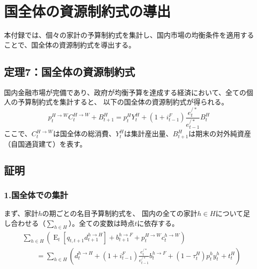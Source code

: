 
\chapter{国全体の資源制約式の導出}
\label{chap:appendix_resource_constraint}

本付録では、個々の家計の予算制約式を集計し、国内市場の均衡条件を適用することで、国全体の資源制約式を導出する。

\section*{定理7：国全体の資源制約式}
\label{sec:appendix_resource_constraint_theorem7}

国内金融市場が完備であり、政府が均衡予算を達成する経済において、全ての個人の予算制約式を集計すると、
以下の国全体の資源制約式が得られる。
\begin{equation}
\label{form:appendix_resource_constraint_theorem7_main}
p_t^{H\to W}C_t^{H\to W}+B_{t+1}^H=p_t^HY_t^H+(1+i_{t-1}^F)\frac{e_t^{/*}}{e_{t-1}^{/*}}B_t^H
\end{equation}
ここで、\(C_t^{H\to W}\)は国全体の総消費、\(Y_t^H\)は集計産出量、\(B_{t+1}^H\)は期末の対外純資産（自国通貨建て）を表す。

\section*{証明}
\label{sec:appendix_resource_constraint_proof}

\subsection*{1.国全体での集計}
\label{sec:appendix_resource_constraint_sub1}
まず、家計\(h\)の期ごとの名目予算制約式を、
国内の全ての家計\(h\in H\)について足し合わせる（\(\sum_{h\in H}\)）。全ての変数は時点\(t\)に依存する。
\begin{equation}
\label{form:appendix_resource_constraint_sub1_aggregate_sum}
\begin{aligned}
&\sum_{h\in H}\left(\operatorname{E}_t[q_{t,t+1}d_{t+1}^{h\to H}]+b_{t+1}^{h\to F}+p_t^{H\to W}c_t^{h\to W}\right) \\
&\qquad=\sum_{h\in H}\left(d_t^{h\to H}+(1+i_{t-1}^F)\frac{e_t^{/*}}{e_{t-1}^{/*}}b_t^{h\to F}+(1-\tau_t^H)p_t^hy_t^h+t_t^H\right)
\end{aligned}
\end{equation}

